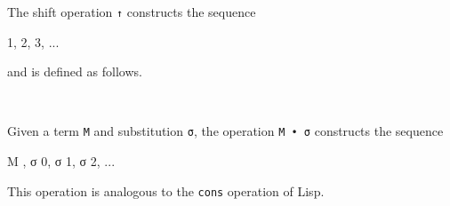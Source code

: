 The shift operation \texttt{↑} constructs the sequence

\begin{myDisplay}
1, 2, 3, ...
\end{myDisplay}

and is defined as follows.

\begin{fence}
\begin{code}%
\>[0]\AgdaSpace{}%
\AgdaSymbol{:}\AgdaSpace{}%
\AgdaSpace{}%
\AgdaSymbol{\}}\AgdaSpace{}%
\AgdaSpace{}%
\AgdaSpace{}%
\AgdaSpace{}%
\AgdaSymbol{(}\AgdaSpace{}%
\AgdaOperator{\AgdaInductiveConstructor{,}}\AgdaSpace{}%
\AgdaSymbol{)}\<%
\\
\>[0]\AgdaSpace{}%
\AgdaSpace{}%
\AgdaSymbol{=}\AgdaSpace{}%
\AgdaSpace{}%
\AgdaSymbol{(}\AgdaSpace{}%
\AgdaSymbol{)}\<%
\end{code}
\end{fence}

Given a term \texttt{M} and substitution \texttt{σ}, the operation
\texttt{M\ •\ σ} constructs the sequence

\begin{myDisplay}
M , σ 0, σ 1, σ 2, ...
\end{myDisplay}

This operation is analogous to the \texttt{cons} operation of Lisp.

